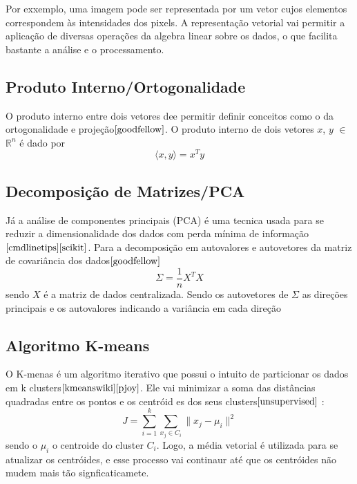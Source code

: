 \documentclass[a4paper,12pt]{article}
\begin{document}
Por exxemplo, uma imagem pode ser representada por um vetor cujos elementos correspondem às intensidades dos pixels. A representação vetorial vai permitir a aplicação de diversas operações da algebra linear sobre os dados, o que facilita bastante a análise e o processamento.

\subsection{Produto Interno/Ortogonalidade}
O produto interno entre dois vetores dee permitir definir conceitos como o da ortogonalidade e projeção$\cite{goodfellow}$. O produto interno de dois vetores $x$, $y$ $\in$ $\mathbb{R}^n$ é dado por 
\begin{equation}
\langle x, y \rangle = x^T y    
\end{equation}

\subsection{Decomposição de Matrizes/PCA}
Já a análise de componentes principais (PCA) é uma tecnica usada para se reduzir a dimensionalidade dos dados com perda mínima de informação$\cite{cmdlinetips}\cite{scikit}$. Para a decomposição em autovalores e autovetores da matriz de covariância dos dados$\cite{goodfellow}$
\begin{equation}
\Sigma = \frac{1}{n}X^TX 
\end{equation} 
sendo $X$ é a matriz de dados centralizada. Sendo os autovetores de $\Sigma$ as direções principais e os autovalores indicando a variância em cada direção 

\subsection{Algoritmo K-means }
O K-menas é um algoritmo iterativo que possui o intuito de particionar os dados em k clusters$\cite{kmeanswiki}\cite{pjoy}$. Ele vai minimizar a soma das distâncias quadradas entre os pontos e os centróid es dos seus clusters$\cite{unsupervised}$ :
\begin{equation}
J = \sum_{i=1}^{k} \sum_{x_j \in C_i} \| x_j - \mu_i \|^2
\end{equation}
sendo o $\mu_i$ o centroide do cluster $C_i$. Logo, a média vetorial é utilizada para se atualizar os centróides, e esse processo vai continaur até que os centróides não mudem mais tão signficaticamete.
\end{document}
